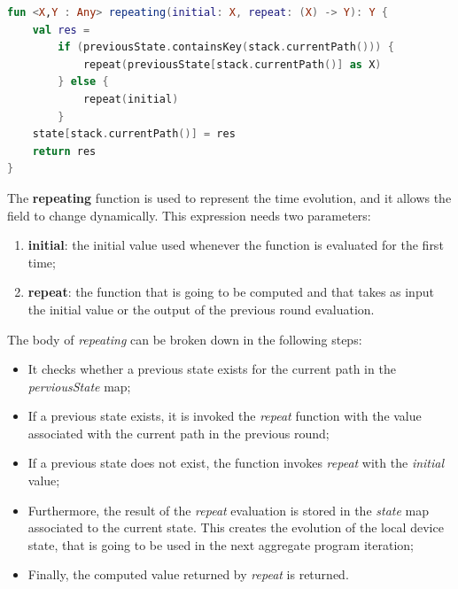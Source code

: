 \begin{lstlisting}[caption={Repeating implementation}, captionpos=b, language=Kotlin, label={code:repeating_implementation}]
fun <X,Y : Any> repeating(initial: X, repeat: (X) -> Y): Y {
    val res = 
        if (previousState.containsKey(stack.currentPath())) {
            repeat(previousState[stack.currentPath()] as X) 
        } else {
            repeat(initial)
        }
    state[stack.currentPath()] = res
    return res
}
\end{lstlisting}
The \textbf{repeating} function is used to represent the time evolution, and it allows the field to change dynamically.\newline
This expression needs two parameters:
\begin{enumerate}
    \item \textbf{initial}: the initial value used whenever the function is evaluated for the first time;
    \item \textbf{repeat}: the function that is going to be computed and that takes as input the initial value or the output of the previous round evaluation.
\end{enumerate}
The body of \textit{repeating} can be broken down in the following steps:
\begin{itemize}
    \item It checks whether a previous state exists for the current path in the \textit{perviousState} map;
    \item If a previous state exists, it is invoked the \textit{repeat} function with the value associated with the current path in the previous round;
    \item If a previous state does not exist, the function invokes \textit{repeat} with the \textit{initial} value;
    \item Furthermore, the result of the \textit{repeat} evaluation is stored in the \textit{state} map associated to the current state. This creates the evolution of the local device state, that is going to be used in the next aggregate program iteration;
    \item Finally, the computed value returned by \textit{repeat} is returned.
\end{itemize}

